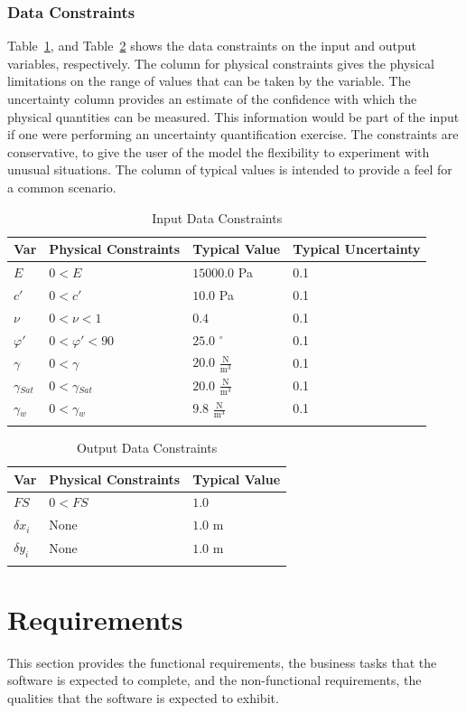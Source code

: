 \documentclass[12pt]{article}
\begin{document}
\subsubsection{Data Constraints}
\label{Sec:DataCons}
Table~\ref{Table:InpuDataCons}, and Table~\ref{Table:OutpDataCons} shows the data constraints on the input and output variables, respectively. The column for physical constraints gives the physical limitations on the range of values that can be taken by the variable. The uncertainty column provides an estimate of the confidence with which the physical quantities can be measured. This information would be part of the input if one were performing an uncertainty quantification exercise. The constraints are conservative, to give the user of the model the flexibility to experiment with unusual situations. The column of typical values is intended to provide a feel for a common scenario.
\begin{longtable}{l l l l}
\toprule
Var & Physical Constraints & Typical Value & Typical Uncertainty
\\
\midrule
$E$ & $0<E$ & $15000.0$ Pa & 0.1
\\
$c'$ & $0<c'$ & $10.0$ Pa & 0.1
\\
$\nu{}$ & $0<\nu{}<1$ & $0.4$ & 0.1
\\
$\varphi{}'$ & $0<\varphi{}'<90$ & $25.0$ ${}^{\circ}$ & 0.1
\\
$\gamma{}$ & $0<\gamma{}$ & $20.0$ $\frac{\text{N}}{\text{m}^{3}}$ & 0.1
\\
$\gamma{}_{Sat}$ & $0<\gamma{}_{Sat}$ & $20.0$ $\frac{\text{N}}{\text{m}^{3}}$ & 0.1
\\
$\gamma{}_{w}$ & $0<\gamma{}_{w}$ & $9.8$ $\frac{\text{N}}{\text{m}^{3}}$ & 0.1
\\
\bottomrule
\caption{Input Data Constraints}
\label{Table:InpuDataCons}
\end{longtable}
\begin{longtable}{l l l}
\toprule
Var & Physical Constraints & Typical Value
\\
\midrule
$FS$ & $0<FS$ & $1.0$
\\
$\delta{}x_{i}$ & None & $1.0$ m
\\
$\delta{}y_{i}$ & None & $1.0$ m
\\
\bottomrule
\caption{Output Data Constraints}
\label{Table:OutpDataCons}
\end{longtable}
\section{Requirements}
\label{Sec:Requ}
This section provides the functional requirements, the business tasks that the software is expected to complete, and the non-functional requirements, the qualities that the software is expected to exhibit.
\end{document}
